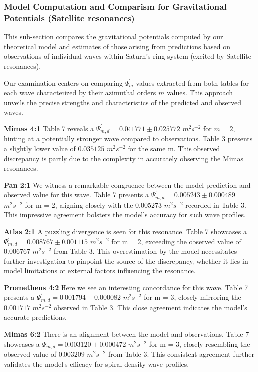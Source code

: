 \documentclass{article}
\begin{document}

\subsubsection{Model Computation and Comparism for Gravitational Potentials (Satellite resonances)}

This sub-section compares the gravitational potentials computed by our theoretical model and estimates of those arising from predictions based on observations of individual waves within Saturn's ring system (excited by Satellite resonances).

Our examination centers on comparing $\Psi_{m}^{'}$ values extracted from both tables for each wave characterized by their azimuthal orders $m$ values. This approach unveils the precise strengths and characteristics of the predicted and observed waves.

\textbf{Mimas 4:1}
Table 7 reveals a $\Psi_{m,d}^{'} = 0.041771 \pm 0.025772$ $m^{2}s^{-2}$ for $m = 2$, hinting at a potentially stronger wave compared to observations. Table 3 presents a slightly lower value of $0.035125$ $m^{2}s^{-2}$ for the same m. This observed discrepancy is partly due to the complexity in accurately observing the Mimas resonances.

\textbf{Pan 2:1}
We witness a remarkable congruence between the model prediction and observed value for this wave. Table 7 presents a $\Psi_{m,d}^{'} = 0.005243 \pm 0.000489$ $m^{2}s^{-2}$ for m = 2, aligning closely with the $0.005273$ $m^{2}s^{-2}$ recorded in Table 3. This impressive agreement bolsters the model's accuracy for such wave profiles.

\textbf{Atlas 2:1}
A puzzling divergence is seen for this resonance. Table 7 showcases a $\Psi_{m,d}^{'} = 0.008767 \pm 0.001115$ $m^{2}s^{-2}$ for m = 2, exceeding the observed value of $0.006767$ $m^{2}s^{-2}$ from Table 3. This overestimation by the model necessitates further investigation to pinpoint the source of the discrepancy, whether it lies in model limitations or external factors influencing the resonance.

\textbf{Prometheus 4:2}
Here we see an interesting concordance for this wave. Table 7 presents a $\Psi_{m,d}^{'} = 0.001794 \pm 0.000082$ $m^{2}s^{-2}$ for m = 3, closely mirroring the $0.001717$ $m^{2}s^{-2}$ observed in Table 3. This close agreement indicates the model's accurate predictions.

\textbf{Mimas 6:2}
 There is an alignment between the model and observations. Table 7 showcases a $\Psi_{m,d}^{'} = 0.003120 \pm 0.000472$ $m^{2}s^{-2}$ for m = 3, closely resembling the observed value of $0.003209$ $m^{2}s^{-2}$ from Table 3. This consistent agreement further validates the model's efficacy for spiral density wave profiles.
\end{document}
